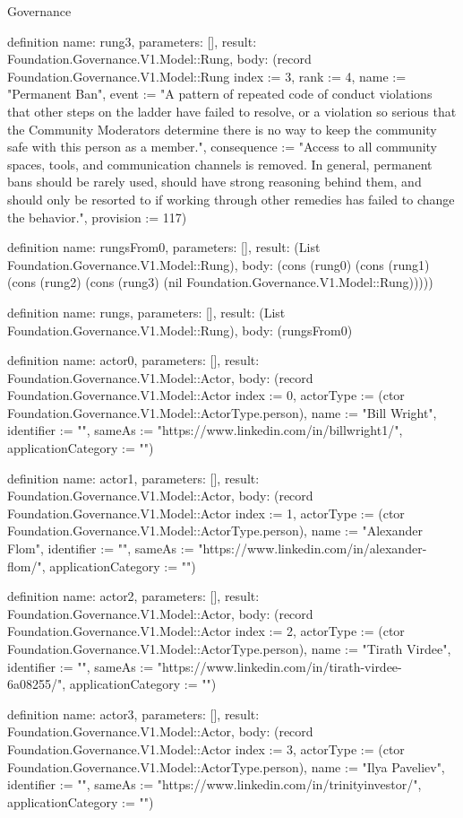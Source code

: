 \begin{lexlean}{Governance}
\begin{semanticmodule}
definition{
  name: rung3,
  parameters: [],
  result: Foundation.Governance.V1.Model::Rung,
  body: (record Foundation.Governance.V1.Model::Rung {index := 3, rank := 4, name := "Permanent Ban", event := "A pattern of repeated code of conduct violations that other steps on the ladder have failed to resolve, or a violation so serious that the Community Moderators determine there is no way to keep the community safe with this person as a member.", consequence := "Access to all community spaces, tools, and communication channels is removed. In general, permanent bans should be rarely used, should have strong reasoning behind them, and should only be resorted to if working through other remedies has failed to change the behavior.", provision := 117})
}

definition{
  name: rungsFrom0,
  parameters: [],
  result: (List Foundation.Governance.V1.Model::Rung),
  body: (cons (rung0) (cons (rung1) (cons (rung2) (cons (rung3) (nil Foundation.Governance.V1.Model::Rung)))))
}

definition{
  name: rungs,
  parameters: [],
  result: (List Foundation.Governance.V1.Model::Rung),
  body: (rungsFrom0)
}

definition{
  name: actor0,
  parameters: [],
  result: Foundation.Governance.V1.Model::Actor,
  body: (record Foundation.Governance.V1.Model::Actor {index := 0, actorType := (ctor Foundation.Governance.V1.Model::ActorType.person), name := "Bill Wright", identifier := "", sameAs := "https://www.linkedin.com/in/billwright1/", applicationCategory := ""})
}

definition{
  name: actor1,
  parameters: [],
  result: Foundation.Governance.V1.Model::Actor,
  body: (record Foundation.Governance.V1.Model::Actor {index := 1, actorType := (ctor Foundation.Governance.V1.Model::ActorType.person), name := "Alexander Flom", identifier := "", sameAs := "https://www.linkedin.com/in/alexander-flom/", applicationCategory := ""})
}

definition{
  name: actor2,
  parameters: [],
  result: Foundation.Governance.V1.Model::Actor,
  body: (record Foundation.Governance.V1.Model::Actor {index := 2, actorType := (ctor Foundation.Governance.V1.Model::ActorType.person), name := "Tirath Virdee", identifier := "", sameAs := "https://www.linkedin.com/in/tirath-virdee-6a08255/", applicationCategory := ""})
}

definition{
  name: actor3,
  parameters: [],
  result: Foundation.Governance.V1.Model::Actor,
  body: (record Foundation.Governance.V1.Model::Actor {index := 3, actorType := (ctor Foundation.Governance.V1.Model::ActorType.person), name := "Ilya Paveliev", identifier := "", sameAs := "https://www.linkedin.com/in/trinityinvestor/", applicationCategory := ""})
}


\end{semanticmodule}
\end{lexlean}

